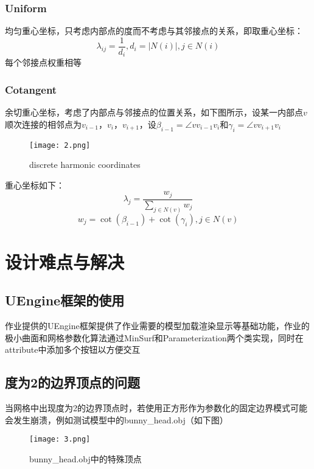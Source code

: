 \documentclass[14pt]{scrartcl} %
\begin{document}
\subsubsection{Uniform}
均匀重心坐标，只考虑内部点的度而不考虑与其邻接点的关系，即取重心坐标：
\begin{equation}
\lambda_{ij}=\frac{1}{d_i},d_i=|N(i)|,j\in N(i)
\end{equation}
每个邻接点权重相等

\subsubsection{Cotangent}
余切重心坐标，考虑了内部点与邻接点的位置关系，如下图所示，设某一内部点$v$顺次连接的相邻点为$v_{i-1}$，$v_i$，$v_{i+1}$，设$\beta_{i-1}=\angle{vv_{i-1}v_i}$和$\gamma_i=\angle{vv_{i+1}v_i}$
\begin{figure}[h] %
	\centering
	\texttt{[image: 2.png]} %
	\caption{discrete harmonic coordinates}
\end{figure}

重心坐标如下：
\begin{equation}
\lambda_j=\frac{w_j}{\sum\limits_{j\in N(v)}w_j}
\end{equation}
\begin{equation}
w_j=\cot(\beta_{i-1})+\cot(\gamma_i),j\in N(v)
\end{equation}


\pagebreak
\section{设计难点与解决}

\subsection{UEngine框架的使用}

作业提供的UEngine框架提供了作业需要的模型加载渲染显示等基础功能，作业的极小曲面和网格参数化算法通过MinSurf和Parameterization两个类实现，同时在attribute中添加多个按钮以方便交互

\subsection{度为2的边界顶点的问题}
当网格中出现度为2的边界顶点时，若使用正方形作为参数化的固定边界模式可能会发生崩溃，例如测试模型中的bunny\_head.obj（如下图）
\begin{figure}[h] %
	\centering
	\texttt{[image: 3.png]} %
	\caption{bunny\_head.obj中的特殊顶点 }
\end{figure}
\end{document}
